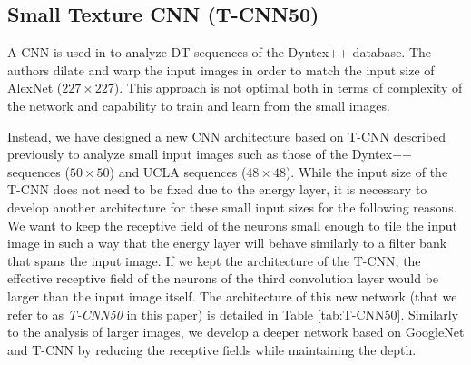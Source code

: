 \documentclass[a4paper,11pt]{article}
\begin{document}
\subsection{Small Texture CNN (T-CNN50)}%
\label{subsec:SmallCNN}
A CNN is used in \cite{culibrk2014temporal} to analyze DT sequences of the Dyntex++ database. The authors dilate and warp the input images in order to match the input size of AlexNet ($227\times 227$). 
This approach is not optimal both in terms of complexity of the network and capability to train and learn from the small images.

Instead, we have designed a new CNN architecture based on T-CNN described previously to analyze small input images such as those of the Dyntex++ sequences ($50\times 50$) and UCLA sequences ($48\times 48$). 
While the input size of the T-CNN does not need to be fixed due to the energy layer, it is necessary to develop another architecture for these small input sizes for the following reasons.
We want to keep the receptive field of the neurons small enough to tile the input image in such a way that the energy layer will behave similarly to a filter bank that spans the input image.
If we kept the architecture of the T-CNN, the effective receptive field of the neurons of the third convolution layer would be larger than the input image itself.
The architecture of this new network (that we refer to as \textit{T-CNN50} in this paper) is detailed in Table \ref{tab:T-CNN50}.
Similarly to the analysis of larger images, we develop a deeper network based on GoogleNet and T-CNN by reducing the receptive fields while maintaining the depth.
\end{document}
